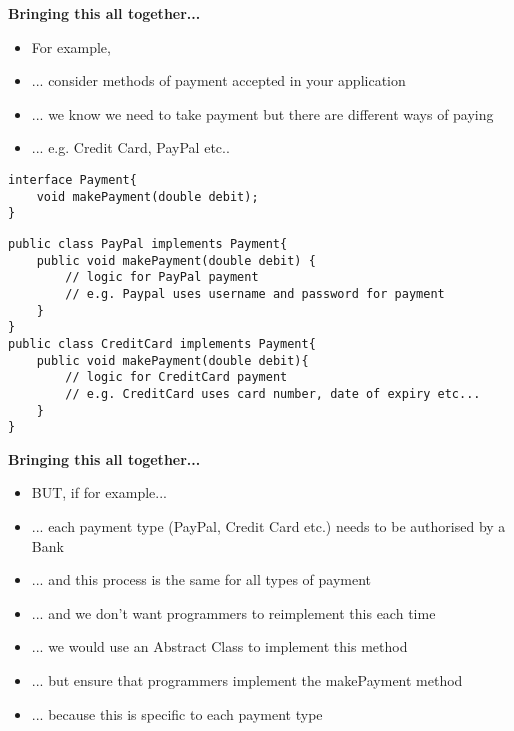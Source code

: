 \documentclass{beamer}
\begin{document}
\begin{frame}
\begin{center}
\textbf{Bringing this all together...}
\end{center}
\begin{itemize}
\item For example, 
\bigskip
\item ... consider methods of payment accepted in your application
\item ... we know we need to take payment but there are different ways of paying
\item ... e.g. Credit Card, PayPal etc..
\end{itemize}
\end{frame}

\begin{frame}[fragile]
\begin{block}{}
\begin{lstlisting}
interface Payment{
    void makePayment(double debit);
}
\end{lstlisting}
\end{block}
\end{frame}

\begin{frame}[fragile]
\begin{block}{}
\begin{lstlisting}
public class PayPal implements Payment{
    public void makePayment(double debit) {
        // logic for PayPal payment
        // e.g. Paypal uses username and password for payment
    }
}
public class CreditCard implements Payment{
    public void makePayment(double debit){
        // logic for CreditCard payment
        // e.g. CreditCard uses card number, date of expiry etc...
    }
}
\end{lstlisting}
\end{block}
\end{frame}

\begin{frame}
\begin{center}
\textbf{Bringing this all together...}
\end{center}
\begin{itemize}
\item BUT, if for example... 
\item ... each payment type (PayPal, Credit Card etc.) needs to be authorised by a Bank
\item ... and this process is the same for all types of payment
\item ... and we don't want programmers to reimplement this each time
\bigskip
\item ... we would use an Abstract Class to implement this method
\item ... but ensure that programmers implement the makePayment method
\item ... because this is specific to each payment type
\end{itemize}
\end{frame}
\end{document}

